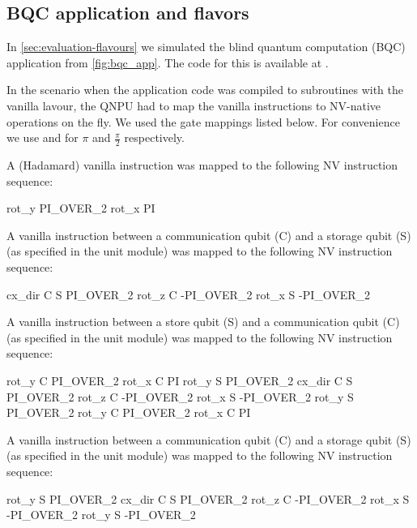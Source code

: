 \subsection{BQC application and flavors}
In \cref{sec:evaluation-flavours} we simulated the blind quantum computation
(BQC) application from \cref{fig:bqc_app}. The code for this is available at
\cite{git_squidasm}.

In the scenario when the application code was compiled to subroutines with the
vanilla lavour, the \ac{QNPU} had to map the vanilla instructions to NV-native
operations on the fly. We used the gate mappings listed below. For
convenience we use  and  for $\pi$ and $\frac{\pi}{2}$
respectively.

A  (Hadamard) vanilla instruction was mapped to the following NV instruction sequence:
\begin{nqcode}
  rot_y PI_OVER_2
  rot_x PI\end{nqcode}

A  vanilla instruction between a communication qubit (C) and a storage
qubit (S) (as specified in the unit module) was mapped to the following NV
instruction sequence:
\begin{nqcode}
  cx_dir C S PI_OVER_2
  rot_z C -PI_OVER_2
  rot_x S -PI_OVER_2\end{nqcode}

A  vanilla instruction between a store qubit (S) and a communication
qubit (C) (as specified in the unit module) was mapped to the following NV
instruction sequence:
\begin{nqcode}
  rot_y C PI_OVER_2
  rot_x C PI
  rot_y S PI_OVER_2
  cx_dir C S PI_OVER_2
  rot_z C -PI_OVER_2
  rot_x S -PI_OVER_2
  rot_y S PI_OVER_2
  rot_y C PI_OVER_2
  rot_x C PI\end{nqcode}

A  vanilla instruction between a communication qubit (C) and a storage
qubit (S) (as specified in the unit module) was mapped to the following NV
instruction sequence:
\begin{nqcode}
  rot_y S PI_OVER_2
  cx_dir C S PI_OVER_2
  rot_z C -PI_OVER_2
  rot_x S -PI_OVER_2
  rot_y S -PI_OVER_2\end{nqcode}